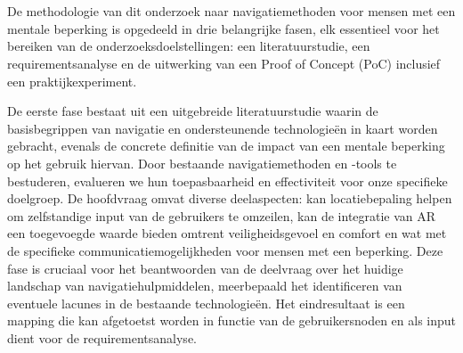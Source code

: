 
\chapter{}%
\label{ch:methodologie}


De methodologie van dit onderzoek naar navigatiemethoden voor mensen met een mentale beperking is opgedeeld in drie belangrijke fasen, elk essentieel voor het bereiken van de onderzoeksdoelstellingen: een literatuurstudie, een requirementsanalyse en de uitwerking van een Proof of Concept (PoC) inclusief een praktijkexperiment.\newline

De eerste fase bestaat uit een uitgebreide literatuurstudie waarin de basisbegrippen van navigatie en ondersteunende technologieën in kaart worden gebracht, evenals de concrete definitie van de impact van een mentale beperking op het gebruik hiervan.  Door bestaande navigatiemethoden en -tools te bestuderen, evalueren we hun toepasbaarheid en effectiviteit voor onze specifieke doelgroep. De hoofdvraag omvat diverse deelaspecten: kan locatiebepaling helpen om zelfstandige input van de gebruikers te omzeilen, kan de integratie van AR een toegevoegde waarde bieden omtrent veiligheidsgevoel en comfort en wat met de specifieke communicatiemogelijkheden voor mensen met een beperking. Deze fase is cruciaal voor het beantwoorden van de deelvraag over het huidige landschap van navigatiehulpmiddelen, meerbepaald het identificeren van eventuele lacunes in de bestaande technologieën. Het eindresultaat is een mapping die kan afgetoetst worden in functie van de gebruikersnoden en als input dient voor de requirementsanalyse.

